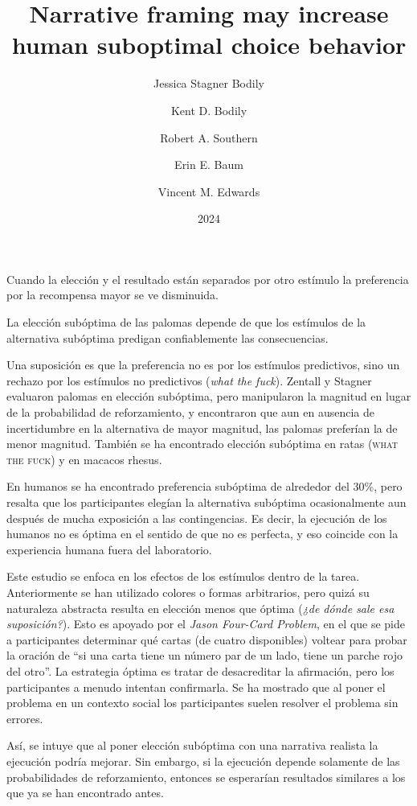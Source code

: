 \documentclass[a4paper,12pt]{article}
\title{Narrative framing may increase human suboptimal choice behavior}
\author{Jessica Stagner Bodily \and Kent D. Bodily \and Robert A. Southern \and Erin E. Baum \and Vincent M. Edwards}
\date{2024}
\begin{document}
{\scshape\bfseries \maketitle}

Cuando la elección y el resultado están separados por otro estímulo la preferencia por la recompensa mayor se ve disminuida.

La elección subóptima de las palomas depende de que los estímulos de la alternativa subóptima predigan confiablemente las consecuencias.

Una suposición es que la preferencia no es por los estímulos predictivos, sino un rechazo por los estímulos no predictivos ({\slshape what the fuck}).
Zentall y Stagner evaluaron palomas en elección subóptima, pero manipularon la magnitud en lugar de la probabilidad de reforzamiento, y encontraron que aun en ausencia de incertidumbre en la alternativa de mayor magnitud, las palomas preferían la de menor magnitud.
También se ha encontrado elección subóptima en ratas ({\scshape what the fuck}) y en macacos rhesus.

En humanos se ha encontrado preferencia subóptima de alrededor del 30\%, pero resalta que los participantes elegían la alternativa subóptima ocasionalmente aun después de mucha exposición a las contingencias.
Es decir, la ejecución de los humanos no es óptima en el sentido de que no es perfecta, y eso coincide con la experiencia humana fuera del laboratorio.

Este estudio se enfoca en los efectos de los estímulos dentro de la tarea.
Anteriormente se han utilizado colores o formas arbitrarios, pero quizá su naturaleza abstracta resulta en elección menos que óptima ({\itshape ¿de dónde sale esa suposición?}).
Esto es apoyado por el {\itshape Jason Four-Card Problem}, en el que se pide a participantes determinar qué cartas (de cuatro disponibles) voltear para probar la oración de ``si una carta tiene un número par de un lado, tiene un parche rojo del otro''.
La estrategia óptima es tratar de desacreditar la afirmación, pero los participantes a menudo intentan confirmarla.
Se ha mostrado que al poner el problema en un contexto social los participantes suelen resolver el problema sin errores.

Así, se intuye que al poner elección subóptima con una narrativa realista la ejecución podría mejorar.
Sin embargo, si la ejecución depende solamente de las probabilidades de reforzamiento, entonces se esperarían resultados similares a los que ya se han encontrado antes.
\end{document}
